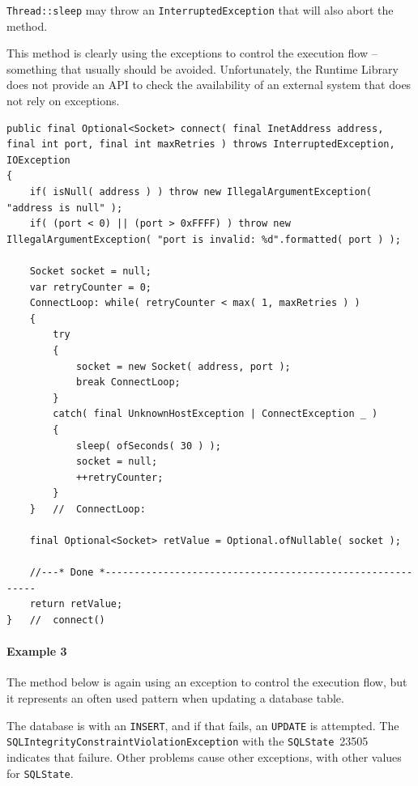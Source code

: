\lstinline|Thread::sleep| may throw an \lstinline|InterruptedException| that will also abort the method.
 
This method is clearly using the exceptions to control the execution flow – something that usually should be avoided. Unfortunately, the \Java Runtime Library does not provide an API to check the availability of an external system that does not rely on exceptions.

\begin{lstlisting}
public final Optional<Socket> connect( final InetAddress address, final int port, final int maxRetries ) throws InterruptedException, IOException
{
    if( isNull( address ) ) throw new IllegalArgumentException( "address is null" );
    if( (port < 0) || (port > 0xFFFF) ) throw new IllegalArgumentException( "port is invalid: %d".formatted( port ) ); 
    
    Socket socket = null;
    var retryCounter = 0;
    ConnectLoop: while( retryCounter < max( 1, maxRetries ) )
    {
        try
        {
            socket = new Socket( address, port );
            break ConnectLoop;
        }
        catch( final UnknownHostException | ConnectException _ )
        {
            sleep( ofSeconds( 30 ) );
            socket = null;
            ++retryCounter;
        }
    }   //  ConnectLoop:

    final Optional<Socket> retValue = Optional.ofNullable( socket );

    //---* Done *----------------------------------------------------------
    return retValue;
}   //  connect()
\end{lstlisting}

\paragraph{Example 3} The method below is again using an exception to control the execution flow, but it represents an often used pattern when updating a database table.

The database is  with an \texttt{INSERT}, and if that fails, an \texttt{UPDATE} is attempted. The \lstinline|SQLIntegrityConstraintViolationException| \autocite{ORACLE_DOC_SQLINTEGRITYCONSTRAINTVIOLATIONEXCEPTION_CLASS} with the \texttt{SQLState}~23505 indicates that failure. Other problems cause other exceptions, with other values for \texttt{SQLState}.

